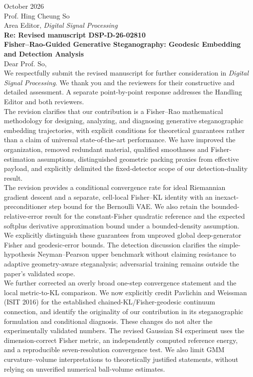 \documentclass[10pt,a4paper]{article}
\begin{document}
 October 2026\\[1em]
\noindent Prof. Hing Cheung So\\ Area Editor, \emph{Digital Signal Processing}\\[1em]
\noindent\textbf{Re: Revised manuscript DSP-D-26-02810}\\
\textbf{Fisher--Rao-Guided Generative Steganography: Geodesic Embedding and Detection Analysis}\\[1.5em]
Dear Prof. So,\\[0.7em]
We respectfully submit the revised manuscript for further consideration in \emph{Digital Signal Processing}. We thank you and the reviewers for their constructive and detailed assessment. A separate point-by-point response addresses the Handling Editor and both reviewers.\\[0.7em]
The revision clarifies that our contribution is a Fisher--Rao mathematical methodology for designing, analyzing, and diagnosing generative steganographic embedding trajectories, with explicit conditions for theoretical guarantees rather than a claim of universal state-of-the-art performance. We have improved the organization, removed redundant material, qualified smoothness and Fisher-estimation assumptions, distinguished geometric packing proxies from effective payload, and explicitly delimited the fixed-detector scope of our detection-duality result.\\[0.7em]
The revision provides a conditional convergence rate for ideal Riemannian gradient descent and a separate, cell-local Fisher--KL identity with an inexact-preconditioner step bound for the Bernoulli VAE. We also retain the bounded-relative-error result for the constant-Fisher quadratic reference and the expected softplus derivative approximation bound under a bounded-density assumption. We explicitly distinguish these guarantees from unproved global deep-generator Fisher and geodesic-error bounds. The detection discussion clarifies the simple-hypothesis Neyman--Pearson upper benchmark without claiming resistance to adaptive geometry-aware steganalysis; adversarial training remains outside the paper's validated scope.\\[0.7em]
We further corrected an overly broad one-step convergence statement and the local metric-to-KL comparison. We now explicitly credit Pavlichin and Weissman (ISIT 2016) for the established chained-KL/Fisher-geodesic continuum connection, and identify the originality of our contribution in its steganographic formulation and conditional diagnosis. These changes do not alter the experimentally validated numbers. The revised Gaussian S4 experiment uses the dimension-correct Fisher metric, an independently computed reference energy, and a reproducible seven-resolution convergence test. We also limit GMM curvature--volume interpretations to theoretically justified statements, without relying on unverified numerical ball-volume estimates.\\[0.7em]
\end{document}
